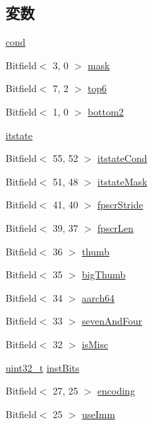 \subsection*{変数}
\begin{DoxyCompactItemize}
\item 
\hyperlink{namespaceArmISA_aa3e1006f963b76263ca7b02f678a7cb4}{cond}
\item 
Bitfield$<$ 3, 0 $>$ \hyperlink{namespaceArmISA_a9534dbda5e7db9881c7955c6e08cfdc0}{mask}
\item 
Bitfield$<$ 7, 2 $>$ \hyperlink{namespaceArmISA_a18831e4ef19960005a3f9a8e4fb8e560}{top6}
\item 
Bitfield$<$ 1, 0 $>$ \hyperlink{namespaceArmISA_a832956bfbdea13e8f103b81de83e947b}{bottom2}
\item 
\hyperlink{namespaceArmISA_a1d0a065e5d269d2cc42b7d9894e4b431}{itstate}
\item 
Bitfield$<$ 55, 52 $>$ \hyperlink{namespaceArmISA_ac2b8eec532f71e3cd86dffcdfe550ec3}{itstateCond}
\item 
Bitfield$<$ 51, 48 $>$ \hyperlink{namespaceArmISA_af766c590d3239cb4c1ea966a0d1dfaf3}{itstateMask}
\item 
Bitfield$<$ 41, 40 $>$ \hyperlink{namespaceArmISA_a002491777017c91b930f14d8439d01db}{fpscrStride}
\item 
Bitfield$<$ 39, 37 $>$ \hyperlink{namespaceArmISA_a5410f4d952695768547721ae68687e4a}{fpscrLen}
\item 
Bitfield$<$ 36 $>$ \hyperlink{namespaceArmISA_a1db12b7d00a60f585c5034cfa8acce60}{thumb}
\item 
Bitfield$<$ 35 $>$ \hyperlink{namespaceArmISA_a611f7ea9b5876e719259740d6a20ffa2}{bigThumb}
\item 
Bitfield$<$ 34 $>$ \hyperlink{namespaceArmISA_a8e41bdae3e058f85978987b8f192684a}{aarch64}
\item 
Bitfield$<$ 33 $>$ \hyperlink{namespaceArmISA_a4ddd73a95e9979aafdc5692dd6448637}{sevenAndFour}
\item 
Bitfield$<$ 32 $>$ \hyperlink{namespaceArmISA_a01bd3f2d8b3a2ff476d4398d0cb6b7c2}{isMisc}
\item 
\hyperlink{Type_8hh_a435d1572bf3f880d55459d9805097f62}{uint32\_\-t} \hyperlink{namespaceArmISA_af1253e1f8c29dc899d2ea02c77bf9801}{instBits}
\item 
Bitfield$<$ 27, 25 $>$ \hyperlink{namespaceArmISA_a8da691ea158973ca44476de7005c1518}{encoding}
\item 
Bitfield$<$ 25 $>$ \hyperlink{namespaceArmISA_a624bbcbfe58c21ba97b715bc2d913788}{useImm}

\end{DoxyCompactItemize}
